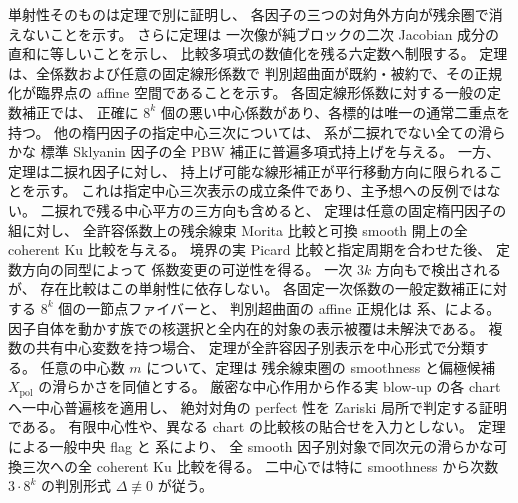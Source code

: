 単射性そのものは定理で別に証明し、
各因子の三つの対角外方向が残余圏で消えないことを示す。
さらに定理は
一次像が純ブロックの二次 Jacobian 成分の直和に等しいことを示し、
比較多項式の数値化を残る六定数へ制限する。
定理は、全係数および任意の固定線形係数で
判別超曲面が既約・被約で、その正規化が臨界点の affine 空間であることを示す。
各固定線形係数に対する一般の定数補正では、
正確に $8^k$ 個の悪い中心係数があり、各標的は唯一の通常二重点を持つ。
他の楕円因子の指定中心三次については、
系が二捩れでない全ての滑らかな
標準 Sklyanin 因子の全 PBW 補正に普遍多項式持上げを与える。
一方、定理は二捩れ因子に対し、
持上げ可能な線形補正が平行移動方向に限られることを示す。
これは指定中心三次表示の成立条件であり、主予想への反例ではない。
二捩れで残る中心平方の三方向も含めると、
定理は任意の固定楕円因子の組に対し、
全許容係数上の残余線束 Morita 比較と可換 smooth 開上の全 coherent Ku 比較を与える。
境界の実 Picard 比較と指定周期を合わせた後、
定数方向の同型によって
係数変更の可逆性を得る。
一次 $3k$ 方向もで検出されるが、
存在比較はこの単射性に依存しない。
各固定一次係数の一般定数補正に対する $8^k$ 個の一節点ファイバーと、
判別超曲面の affine 正規化は
系、による。
因子自体を動かす族での核選択と全内在的対象の表示被覆は未解決である。
複数の共有中心変数を持つ場合、
定理が全許容因子別表示を中心形式で分類する。
任意の中心数 $m$ について、定理は
残余線束圏の smoothness と偏極候補 $X_{\mathrm{pol}}$ の滑らかさを同値とする。
厳密な中心作用から作る実 blow-up の各 chart へ一中心普遍核を適用し、
絶対対角の perfect 性を Zariski 局所で判定する証明である。
有限中心性や、異なる chart の比較核の貼合せを入力としない。
定理による一般中央 flag と
系により、
全 smooth 因子別対象で同次元の滑らかな可換三次への全 coherent Ku 比較を得る。
二中心では特に smoothness から次数 $3\cdot8^k$ の判別形式 $\Delta\not\equiv0$ が従う。

